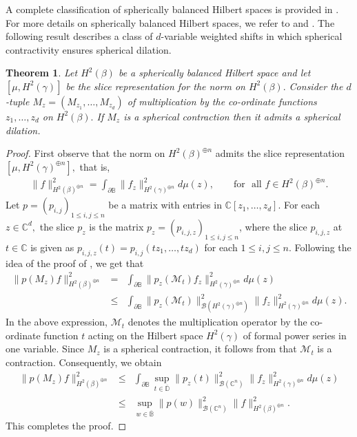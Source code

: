 \documentclass[12pt,reqno] {amsart}
\newtheorem{theorem}{Theorem}
\theoremstyle{remark}
\theoremstyle{definition}
\begin{document}
A complete classification of spherically balanced Hilbert spaces is provided in \cite[Theorem 1.10]{Ch-K}. For more details on spherically balanced Hilbert spaces, we refer to \cite{Ch-K} and \cite{Ku}. 
The following result describes a class of $d$-variable weighted shifts in which spherical contractivity ensures spherical dilation.
\begin{theorem} \label{thm-dila}
Let $H^2(\beta)$ be a spherically balanced Hilbert space and let $[\mu, H^2(\gamma)]$
be the slice representation for the norm on $H^2(\beta).$
Consider the $d$-tuple $M_z=(M_{z_1}, \ldots, M_{z_d})$ of multiplication by the
co-ordinate functions $z_1, \ldots, z_d$ on $H^2(\beta).$ 
If $M_z$ is a spherical contraction then it admits a  spherical dilation. 
\end{theorem}
\begin{proof} First observe that the norm on $H^2(\beta)^{\oplus n}$ admits the slice representation $[\mu, H^2(\gamma)^{\oplus n}],$ that is, \begin{eqnarray*}
     \|{f}\|^2_{H^2(\beta)^{\oplus n}} = \int_{\partial \mathbb
	B}\|{f_z}\|^2_{H^2(\gamma)^{\oplus n}}d\mu(z), \qquad \mbox{for ~all~}f \in
H^2(\beta)^{\oplus n}.
\end{eqnarray*}
Let \( p = (p_{i,j})_{1 \leq i,j \leq n} \) be a matrix with entries in \( \mathbb{C}[z_1, \dots, z_d] \). For each $z \in \mathbb C^d,$ the slice $p_z$ is the matrix \( p_z = (p_{i,j,z})_{1 \leq i,j \leq n} \), where the slice $p_{i,j,z}$ at $t\in \mathbb C$ is given as $p_{i,j,z}(t)=p_{i,j}(tz_1,\ldots,tz_d)$ for each $1 \leq i,j \leq n.$
Following the idea of the proof of \cite[Proposition 2.5]{Ku}, we get that 
\begin{eqnarray*} \|p(M_z)f\|^2_{H^2(\beta)^{\oplus n}} &=& \int_{\partial \mathbb
	B}\|p_z(\mathcal M_{t})f_z\|^2_{H^2(\gamma)^{\oplus n}}d\mu(z) \\
    &\leq &  \int_{\partial \mathbb B} \|p_z(\mathcal M_{t})\|^2_{\mathcal B(H^2(\gamma)^{\oplus n})}\|{f_z}\|^2_{H^2(\gamma)^{\oplus n}}d\mu(z).\end{eqnarray*} 
In the above expression, $\mathcal M_t$ denotes the multiplication operator by the co-ordinate function $t$ acting on the Hilbert space  $H^2(\gamma)$ of formal power series in one variable.  Since  $M_z$ is a spherical contraction, it follows from \cite[Remark 2.3(4)]{Ku} that $\mathcal M_t$ is a contraction. Consequently, we obtain
\begin{eqnarray*}
     \|p(M_z)f\|^2_{H^2(\beta)^{\oplus n}} &\leq &\int_{\partial \mathbb B}  \sup_{t \in \overline{\mathbb D}}\|p_z(t)\|^2_{\mathcal B(\mathbb C^n)}\|{f_z}\|^2_{H^2(\gamma)^{\oplus n}}d\mu(z) \\
     &\leq&  \sup_{w \in \overline{\mathbb B}}\|p(w)\|^2_{\mathcal B(\mathbb C^n)} \|f\|^2_{H^2(\beta)^{\oplus n}}.
\end{eqnarray*} 
This completes the proof.
\end{proof}
\end{document}
